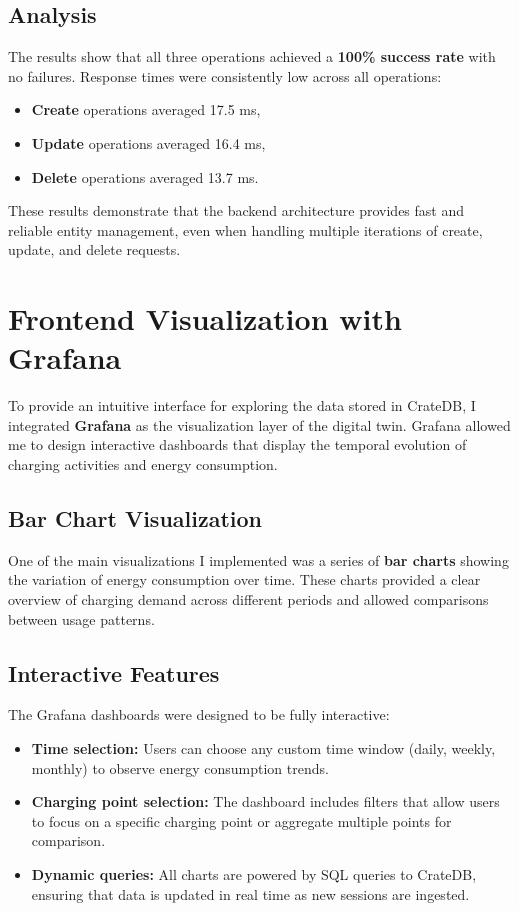 \subsection*{Analysis}
The results show that all three operations achieved a \textbf{100\% success rate} with no failures.  
Response times were consistently low across all operations:
\begin{itemize}
    \item \textbf{Create} operations averaged 17.5 ms,
    \item \textbf{Update} operations averaged 16.4 ms,
    \item \textbf{Delete} operations averaged 13.7 ms.
\end{itemize}

These results demonstrate that the backend architecture provides fast and reliable entity management, even when handling multiple iterations of create, update, and delete requests.


\section{Frontend Visualization with Grafana}

To provide an intuitive interface for exploring the data stored in CrateDB, I integrated \textbf{Grafana} as the visualization layer of the digital twin.  
Grafana allowed me to design interactive dashboards that display the temporal evolution of charging activities and energy consumption.

\subsection*{Bar Chart Visualization}
One of the main visualizations I implemented was a series of \textbf{bar charts} showing the variation of energy consumption over time.  
These charts provided a clear overview of charging demand across different periods and allowed comparisons between usage patterns.

\subsection*{Interactive Features}
The Grafana dashboards were designed to be fully interactive:
\begin{itemize}
    \item \textbf{Time selection:} Users can choose any custom time window (daily, weekly, monthly) to observe energy consumption trends.
    \item \textbf{Charging point selection:} The dashboard includes filters that allow users to focus on a specific charging point or aggregate multiple points for comparison.
    \item \textbf{Dynamic queries:} All charts are powered by SQL queries to CrateDB, ensuring that data is updated in real time as new sessions are ingested.
\end{itemize}

